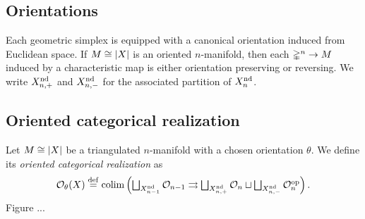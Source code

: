 \subsection{Orientations}

Each geometric simplex is equipped with a canonical orientation induced from Euclidean space.
If $M \cong \lvert X\rvert$ is an oriented $n$-manifold, then each $\mathbb{\Delta}^n \to M$ induced by a characteristic map is either orientation preserving or reversing.
We write $X_{n,+}^{\mathrm{nd}}$ and $X_{n,-}^{\mathrm{nd}}$ for the associated partition of $X_n^{\mathrm{nd}}$.

\subsection{Oriented categorical realization}

Let $M \cong \lvert X\rvert$ be a triangulated $n$-manifold with a chosen orientation $\theta$.
We define its \textit{oriented categorical realization} as
\[
\mathcal{O}_\theta(X) \stackrel{\mathrm{def}}{=}
\textstyle \operatorname*{colim} \left(\bigsqcup_{X_{n-1}^{\mathrm{nd}}} \mathcal{O}_{n-1} \rightrightarrows \bigsqcup_{X_{n,+}^{\mathrm{nd}}} \mathcal{O}_n \sqcup \bigsqcup_{X_{n,-}^{\mathrm{nd}}} \mathcal{O}_n^{\mathrm{op}} \right).
\]
Figure ...